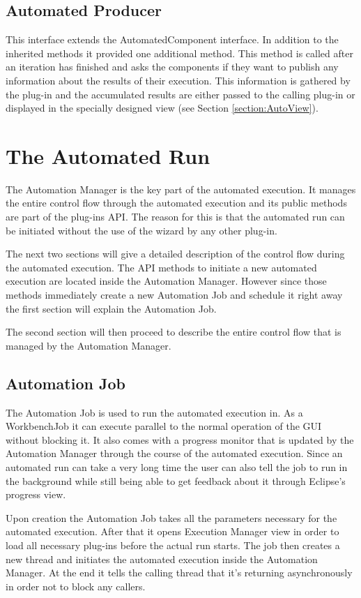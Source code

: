 \subsection{Automated Producer}
This interface extends the AutomatedComponent interface.
In addition to the inherited methods it provided one additional method.
This method is called after an iteration has finished and asks the components
if they want to publish any information about the results of their execution.
This information is gathered by the plug-in and the accumulated results
are either passed to the calling plug-in or displayed in the
specially designed view (see Section \ref{section:AutoView}).


\section{The Automated Run}
\label{section:AutomatedRun}
The Automation Manager is the key part of the automated execution. It manages the entire control flow
through the automated execution and its public methods are part of the plug-ins \ac{API}. The reason
for this is that the automated run can be initiated without the use of the wizard by any other
plug-in.

The next two sections will give a detailed description of the control flow during the automated execution.
The \ac{API} methods to initiate a new automated execution are located inside the Automation Manager. However
since those methods immediately create a new Automation Job and schedule it right away the first section will
explain the Automation Job. 

The second section will then proceed to describe the entire control flow that is managed by the Automation Manager.

\subsection{Automation Job}
\label{section:AutomationJob}
The Automation Job is used to run the automated execution in. As a WorkbenchJob it can execute parallel
to the normal operation of the \ac{GUI} without blocking it. It also comes with a progress monitor that
is updated by the Automation Manager through the course of the automated execution. Since an automated run
can take a very long time the user can also tell the job to run in the background while still being able
to get feedback about it through Eclipse's progress view.

Upon creation the Automation Job takes all the parameters necessary for the automated execution. After that
it opens Execution Manager view in order to load all necessary plug-ins before the actual run starts. 
The job then creates a new thread and initiates the automated execution inside the Automation Manager.
At the end it tells the calling thread that it's returning asynchronously in order not to block any callers.

